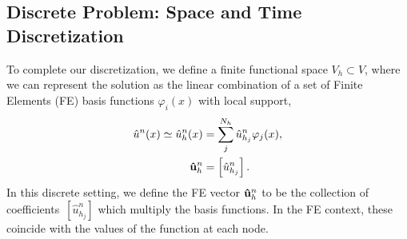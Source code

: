 \documentclass[../../thesis.tex]{subfiles}
\begin{document}
\subsection{Discrete Problem: Space and Time Discretization}
To complete our discretization, we define a finite functional space $V_h \subset V$, where we can represent the solution as the linear combination of a set of Finite Elements (FE) basis functions $\varphi_i(x)$ with local support,
\begin{align}
    \hat{u}^{n}(x) \simeq \hat{u}_h^n(x) &= \sum_j^{N_h} \hat{u}_{h_j}^n \varphi_j(x), \\
    \vb{\hat{u}}_h^{n} &= \left[\hat{u}_{h_j}^n\right].
\end{align}
In this discrete setting, we define the FE vector $\vb{\hat{u}}_h^{n}$ to be the collection of coefficients~$[\hat{u}_{h_j}^n]$ which multiply the basis functions.
In the FE context, these coincide with the values of the function at each node.
\end{document}
